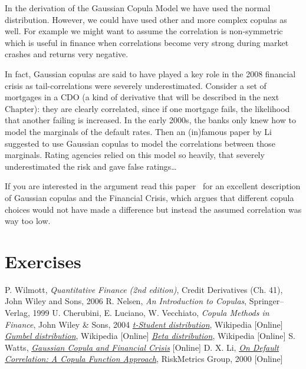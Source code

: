 In the derivation of the Gaussian Copula Model we have used the normal distribution. However, we could have used other and more complex copulas as well. For example we might want to assume the correlation is non-symmetric which is useful in finance when correlations become very strong during market crashes and returns very negative.

In fact, Gaussian copulas are said to have played a key role in the 2008 financial crisis as tail-correlations were severely underestimated. Consider a set of mortgages in a CDO (a kind of derivative that will be described in the next Chapter): they are clearly correlated, since if one mortgage fails, the likelihood that another failing is increased. In the early 2000s, the banks only knew how to model the marginals of the default rates. Then an (in)famous paper by Li~\cite{bib:copula_li} suggested to use Gaussian copulas to model the correlations between those marginals. Rating agencies relied on this model so heavily, that severely underestimated the risk and gave false ratings\ldots

If you are interested in the argument read this paper~\cite{bib:copula_and_2008} for an excellent description of Gaussian copulas and the Financial Crisis, which argues that different copula choices would not have made a difference but instead the assumed correlation was way too low.

\section*{Exercises}


\begin{thebibliography}{9}
P. Wilmott, \emph{Quantitative Finance (2nd edition)}, Credit Derivatives (Ch. 41), John Wiley and Sons, 2006 
R. Nelsen, \emph{An Introduction to Copulas}, Springer–Verlag, 1999
U. Cherubini, E. Luciano, W. Vecchiato, \emph{Copula Methods in Finance}, John Wiley \& Sons, 2004
\href{https://en.wikipedia.org/wiki/Student\%27s\_t-distribution}{\emph{t-Student distribution}}, Wikipedia [Online]
\href{https://en.wikipedia.org/wiki/Gumbel_distribution}{\emph{Gumbel distribution}}, Wikipedia [Online]
\href{https://en.wikipedia.org/wiki/Beta_distribution}{\emph{Beta distribution}}, Wikipedia [Online]
 S. Watts, \href{http://samueldwatts.com/wp-content/uploads/2016/08/Watts-Gaussian-Copula_Financial_Crisis.pdf}{\emph{Gaussian Copula and Financial Crisis}} [Online]
D. X. Li, \href{http://www.maths.lth.se/matstat/kurser/fmsn15masm23/default.pdf}{\emph{On Default Correlation: A Copula Function Approach}}, RiskMetrics Group, 2000 [Online]
\end{thebibliography}
